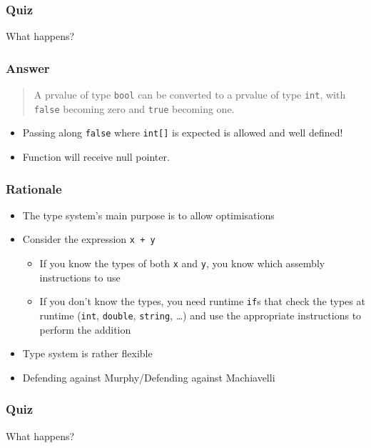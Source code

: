 \begin{frame}
  \frametitle{Quiz}
  \begin{center}
    {\Large What happens?}
  \end{center}
\end{frame}

\begin{frame}
  \frametitle{Answer}
  \begin{quote}
    A prvalue of type {\tt bool} can be converted to a prvalue of type {\tt int}, with {\tt false} becoming zero and {\tt true}
    becoming one. \\
    \hfill {}
  \end{quote}
  \begin{itemize}
    \item Passing along {\tt false} where {\tt int[]} is expected is allowed and well defined!
    \item Function will receive null pointer.
  \end{itemize}
\end{frame}

\begin{frame}
  \frametitle{Rationale}
  \begin{itemize}
    \item The type system's main purpose is to allow optimisations
    \item Consider the expression {\tt x + y} 
          \begin{itemize}
            \item If you know the types of both {\tt x} and {\tt y}, you know
                  which assembly instructions to use
            \item If you don't know the types, you need runtime {\tt if}s that check
                  the types at runtime ({\tt int}, {\tt double}, {\tt string}, \dots)
                  and use the appropriate instructions to perform the addition
          \end{itemize}
    \item Type system is rather flexible
    \item Defending against Murphy/Defending against Machiavelli
  \end{itemize}
\end{frame}

\begin{frame}
  \frametitle{Quiz}
  \begin{center}
    {\Large What happens?}
  \end{center}
\end{frame}

